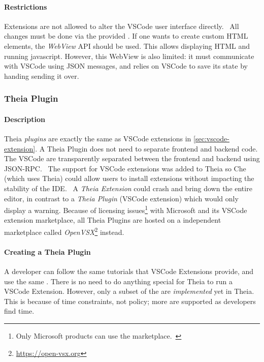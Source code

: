 \paragraph*{Restrictions}
Extensions are not allowed to alter the VSCode user interface directly.~\cite{microsoftExtensionsCapabilitiesOverview2020}
All changes must be done via the provided .
If one wants to create custom HTML elements, the \emph{WebView} \acrshort{API} should be used.
This allows displaying HTML and running javascript.
However, this WebView is also limited: it must communicate with VSCode using \gls{JSON} messages, and relies on VSCode to save its state by handing sending it over.~\cite{microsoftWebviewAPI2020}



\subsubsection{Theia Plugin}\label{sec:theia-plugin}

\paragraph*{Description} \Gls{Theia} \emph{plugins} are exactly the same as VSCode extensions in \cref{sec:vscode-extension}.
A Theia Plugin does not need to separate frontend and backend code.
The VSCode  are transparently separated between the frontend and backend using \gls{JSON-RPC}.~\cite{paulmarechalTheiaPluginImplementation2020}
The support for VSCode extensions was added to Theia so \gls{Che} (which uses Theia) could allow users to install extensions without impacting the stability of the \acrshort{IDE}.~\cite{helmingEclipseTheiaExtensions2019}
A \emph{Theia Extension} could crash and bring down the entire editor, in contrast to a \emph{Theia Plugin} (VSCode extension) which would only display a warning.
Because of licensing issues\footnote{Only Microsoft products can use the marketplace.~\cite{svenefftingeOpenVSX2020}} with Microsoft and its VSCode extension marketplace, all Theia Plugins are hosted on a independent marketplace called \emph{OpenVSX}\footnote{\href{https://open-vsx.org}{https://open-vsx.org}} instead.~\cite{svenefftingeOpenVSX2020}

\paragraph*{Creating a Theia Plugin}
A developer can follow the same tutorials that VSCode Extensions provide, and use the same .
There is no need to do anything special for Theia to run a VSCode Extension.
However, only a subset of the  are \emph{implemented} yet in Theia.
This is because of time constraints, not policy; more  are supported as developers find time.

